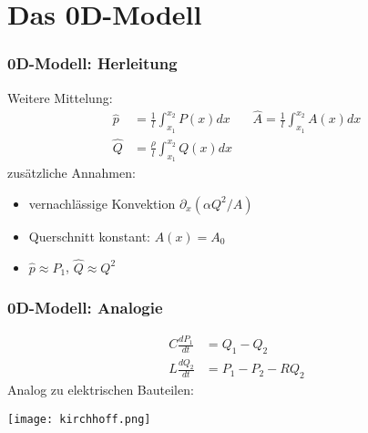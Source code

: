 \section{Das 0D-Modell}

\begin{frame}\frametitle{0D-Modell: Herleitung}

Weitere Mittelung:
\begin{align*}
  \hat p &= \frac{1}{l} \int_{x_1}^{x_2} P(x) dx~~~~~~~~
  \hat A = \frac{1}{l} \int_{x_1}^{x_2} A(x) dx\\
  \hat Q &= \frac{\rho}{l} \int_{x_1}^{x_2} Q(x) dx
\end{align*}
\pause
zusätzliche Annahmen:
\begin{itemize}
  \item vernachlässige Konvektion $\partial_x (\alpha Q^2 / A)$
  \item Querschnitt konstant: $A(x) = A_0$
  \item $\hat p \approx P_1$, $\hat Q \approx Q^2$
\end{itemize}

\end{frame}

%
%



\begin{frame}
\frametitle{0D-Modell: Analogie}
\begin{equation}
  \begin{aligned}
    C \frac{dP_1}{dt} &= Q_1 - Q_2\\
    L \frac{dQ_2}{dt} &= P_1 - P_2 - RQ_2
  \end{aligned}
\end{equation}
\pause
Analog zu elektrischen Bauteilen:
\begin{center}
  \texttt{[image: kirchhoff.png]}
\end{center}
\end{frame}

